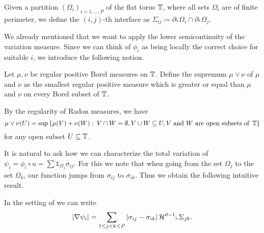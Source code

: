 \begin{definition}
	Given a partition $ \left( \Omega_{ i } \right)_{ i = 1 , \dotsc , P } $ of 
	the flat torus $ \operatorname{\mathbb{T}} $, where all sets $ \Omega_{ i } $ are of 
	finite perimeter, we define the $ (i,j)$-th interface as $ \Sigma_{ i j } 
	\coloneqq \partial_{ \ast } \Omega_{ i } \cap \partial_{ \ast } \Omega_{ j 
	} $.
\end{definition}

We already mentioned that we want to apply the lower semicontinuity of the variation measure. Since we can think of $ \phi_{ i } $ as being locally the correct choice for suitable $ i $, we introduce the following notion.

\begin{definition}
	Let $ \mu , \nu $ be regular positive Borel measures on $ \operatorname{\mathbb{T}} $. 
	Define the supremum $ \mu \vee \nu $ of $ \mu $ and $ \nu $ as the smallest 
	regular positive measure which is greater or equal than $ \mu $ and $ \nu $ 
	on every Borel subset of $ \operatorname{\mathbb{T}} $. 
\end{definition}

\begin{remark}
By the regularity of Radon 
	measures, we have
	\begin{equation*}
		\mu \vee \nu ( U ) 
		=
		\sup \left\{
			\mu ( V ) + \nu ( W )
			\, \colon \,
			V \cap W = \emptyset,
			V \cup W \subseteq U, 
			V \text{ and } W \text{ are open subsets of } \operatorname{\mathbb{T}}
		\right\}
	\end{equation*}
	for any open subset $ U \subseteq \operatorname{\mathbb{T}} $.
\end{remark}

It is natural to ask how we can characterize the total variation of $ \psi_{ i 
} = \phi_{ i } \circ u = \sum \mathds{ 1 }_{ \Omega_{ j } } \sigma_{ i j } $. 
For this we note that when going from the set $ \Omega_{ j } $ to the set $ 
\Omega_{ k } $, 
our function jumps from $ \sigma_{ i j } $ to $ \sigma_{ i k } $. Thus we 
obtain the following intuitive result.

\begin{lemma}
	\label{rewriting_variation_of_psi_i}
	In the setting of  we can write
	\begin{equation*}
		\abs{ \nabla \psi_{ i } }
		=
		\sum_{ 1 \leq j < k \leq P }
			\abs{ \sigma_{ i j } - \sigma_{ i k } }
			\operatorname{\mathcal{H}}^{ d - 1 } \llcorner{ \Sigma_{ j k } } .
	\end{equation*}
\end{lemma}

